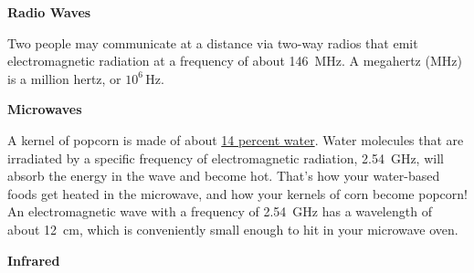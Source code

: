 \documentclass[dvipsnames]{article}
\begin{document}
\textbf{Radio Waves}

Two people may communicate at a distance via two-way radios that emit electromagnetic radiation at a frequency of about \SI{146}{MHz}. A megahertz (MHz) is a million hertz, or $10^6\,\text{Hz}$.


\begin{center}
\end{center}

\textbf{Microwaves}

A kernel of popcorn is made of about \href{https://www.scientificamerican.com/article/explore-the-pop-in-popcorn/}{14 percent water}. Water molecules that are irradiated by a specific frequency of electromagnetic radiation, \SI{2.54}{GHz}, will absorb the energy in the wave and become hot. That's how your water-based foods get heated in the microwave, and how your kernels of corn become popcorn! An electromagnetic wave with a frequency of \SI{2.54}{GHz} has a wavelength of about \SI{12}{cm}, which is conveniently small enough to hit in your microwave oven. 


\begin{center}
\end{center}

\textbf{Infrared}
\end{document}
